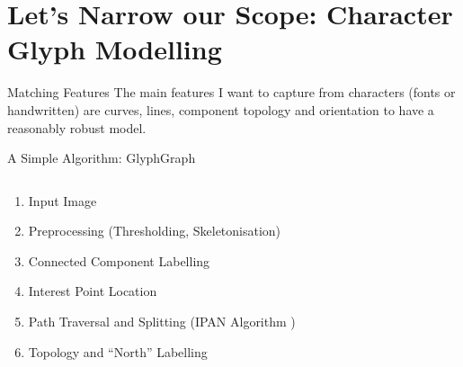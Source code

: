 \documentclass[10pt]{beamer}
\begin{document}

\section{Let's Narrow our Scope: Character Glyph Modelling}

\begin{frame}{Matching Features}
	The main features I want to capture from characters (fonts or handwritten) are \alert{curves}, \alert{lines}, \alert{component topology} and \alert{orientation} to have a reasonably robust model.
\end{frame}

\begin{frame}{A Simple Algorithm: GlyphGraph}
\begin{columns}
	\begin{column}{0.4\linewidth}
		\only<4>{\vspace{-1.5em}}
		\begin{enumerate}[<alert@+>]
			\item Input Image
			\item Preprocessing (Thresholding, Skeletonisation)
			\item Connected Component Labelling
			\item Interest Point Location
			\item Path Traversal and Splitting (IPAN Algorithm \cite{PathCurvature})
			\item Topology and ``North'' Labelling
		\end{enumerate}
	\end{column}
	\begin{column}{0.6\linewidth}
		\def\pixels{
			{0,0,0,0,0,0,0,0,0,0,0},
			{0,0,0,0,1,1,1,0,0,0,0},
			{0,0,0,1,0,0,0,1,0,0,0},
			{0,0,1,0,0,0,0,0,1,0,0},
			{0,0,1,0,0,0,0,0,1,0,0},
			{0,0,1,0,1,1,1,0,1,0,0},
			{0,0,1,0,0,0,0,0,1,0,0},
			{0,0,1,0,0,0,0,0,1,0,0},
			{0,0,0,1,0,0,0,1,0,0,0},
			{0,0,0,0,1,1,1,0,0,0,0},
			{0,0,0,0,0,0,0,0,0,0,0}%
		}
		\def\comps{
			{0,0,0,0,0,0,0,0,0,0,0},
			{0,0,0,0,2,2,2,0,0,0,0},
			{0,0,0,2,0,0,0,2,0,0,0},
			{0,0,2,0,0,0,0,0,2,0,0},
			{0,0,2,0,0,0,0,0,2,0,0},
			{0,0,2,0,3,3,3,0,2,0,0},
			{0,0,2,0,0,0,0,0,2,0,0},
			{0,0,2,0,0,0,0,0,2,0,0},
			{0,0,0,2,0,0,0,2,0,0,0},
			{0,0,0,0,2,2,2,0,0,0,0},
			{0,0,0,0,0,0,0,0,0,0,0}%
		}
			
	

\end{column}
\end{columns}
\end{frame}
\end{document}
